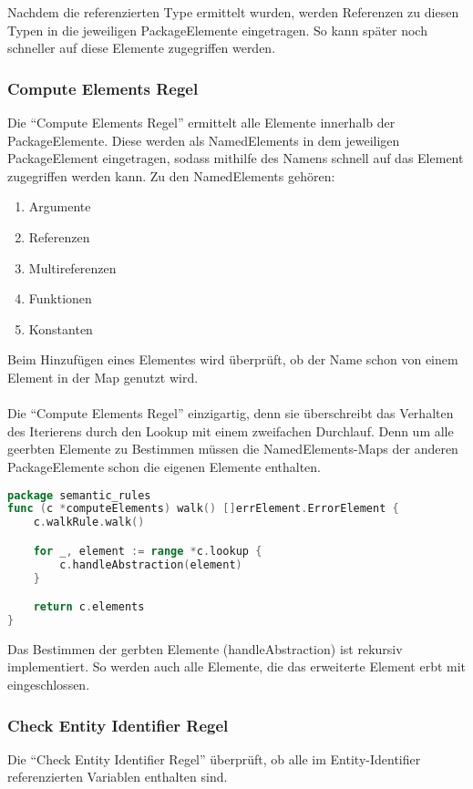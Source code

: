 \documentclass[./einleitung.tex]{subfiles}
\begin{document}
    Nachdem die referenzierten Type ermittelt wurden, werden Referenzen zu diesen Typen in die jeweiligen PackageElemente eingetragen.
    So kann später noch schneller auf diese Elemente zugegriffen werden.

    \subsubsection{Compute Elements Regel}
    Die ``Compute Elements Regel'' ermittelt alle Elemente innerhalb der PackageElemente.
    Diese werden als NamedElements in dem jeweiligen PackageElement eingetragen, sodass mithilfe des Namens schnell auf das Element zugegriffen werden kann.
    Zu den NamedElements gehören:
    \begin{enumerate}
        \item Argumente
        \item Referenzen
        \item Multireferenzen
        \item Funktionen
        \item Konstanten
    \end{enumerate}
    Beim Hinzufügen eines Elementes wird überprüft, ob der Name schon von einem Element in der Map genutzt wird. \\ \\
    Die ``Compute Elements Regel'' einzigartig, denn sie überschreibt das Verhalten des Iterierens durch den Lookup mit einem zweifachen Durchlauf.
    Denn um alle geerbten Elemente zu Bestimmen müssen die NamedElements-Maps der anderen PackageElemente schon die eigenen Elemente enthalten.
    \begin{lstlisting}[language=Go]
package semantic_rules
func (c *computeElements) walk() []errElement.ErrorElement {
	c.walkRule.walk()

	for _, element := range *c.lookup {
		c.handleAbstraction(element)
	}

	return c.elements
}
    \end{lstlisting}
    Das Bestimmen der gerbten Elemente (handleAbstraction) ist rekursiv implementiert.
    So werden auch alle Elemente, die das erweiterte Element erbt mit eingeschlossen.

    \subsubsection{Check Entity Identifier Regel}
    Die ``Check Entity Identifier Regel'' überprüft, ob alle im Entity-Identifier referenzierten Variablen enthalten sind.
\end{document}
